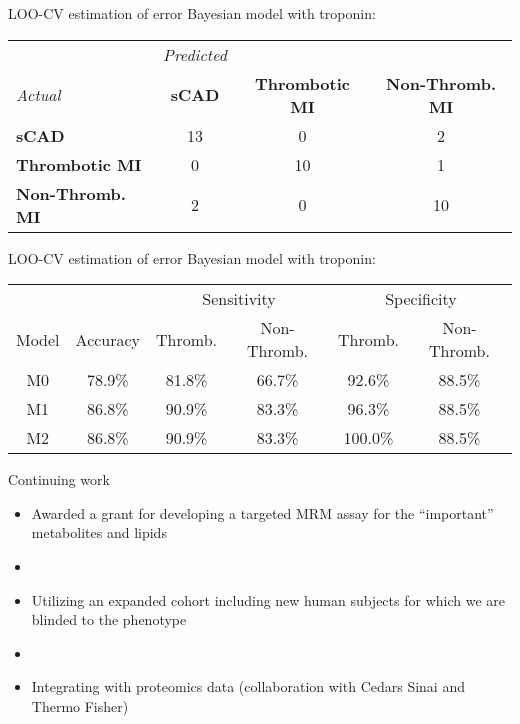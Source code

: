 \documentclass[xcolor=dvipsnames]{beamer}
\begin{document}
\begin{frame}{LOO-CV estimation of error}
\vspace{-15pt}
Bayesian model with troponin:
\vspace{4ex}

\begin{tabular}{l|ccc}
& \emph{Predicted} & & \\
\emph{Actual}  &     \textbf{sCAD} & \textbf{Thrombotic MI} & \textbf{Non-Thromb. MI} \\
\hline
\textbf{sCAD}   &     13    &     0    &     2\\
\textbf{Thrombotic MI}  &  0    &    10    &     1\\
\textbf{Non-Thromb. MI} &   2  &   0 &    10
\end{tabular}
\end{frame}

\begin{frame}{LOO-CV estimation of error}
\vspace{-15pt}
Bayesian model with troponin:
\vspace{2ex}
\begin{center}
\begin{tabular}{|c|c|cc|cc|}
\hline
& & \multicolumn{2}{|c|}{Sensitivity} & \multicolumn{2}{|c|}{Specificity} \\
Model & Accuracy & Thromb. & Non-Thromb. &  Thromb. & Non-Thromb.  \\
\hline
M0 & 78.9\% & 81.8\% & 66.7\% & 92.6\% & 88.5\% \\
M1 & 86.8\% & 90.9\% & 83.3\% & 96.3\% & 88.5\% \\
M2 & 86.8\% & 90.9\% & 83.3\% & 100.0\% & 88.5\% \\
\hline
\end{tabular}
\end{center}
\end{frame}

\begin{frame}{Continuing work}
	\vspace{-7pt}
	\begin{itemize}
		\item Awarded a grant for developing a targeted MRM assay for the ``important'' metabolites and lipids \pause
		\item[]
		\item Utilizing an expanded cohort including new human subjects for which we are blinded to the phenotype \pause
		\item[]
		\item Integrating with proteomics data (collaboration with Cedars Sinai and Thermo Fisher)
	\end{itemize}
\end{frame}
\end{document}
